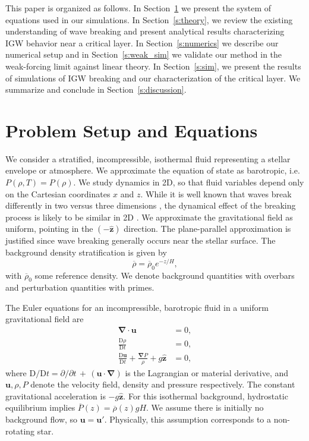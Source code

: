 \documentclass[
        fleqn,
        usenatbib,
    ]{mnras}
\newcommand*{\mdil}[2]{\mathrm{D}#1/\mathrm{D}#2}
\newcommand*{\pdil}[2]{\partial#1/\partial#2}
\newcommand*{\md}[2]{\frac{\mathrm{D}#1}{\mathrm{D}#2}}
\newcommand*{\p}[1]{\left(#1\right)}
\newcommand*{\bm}[1]{\mathbf{#1}}
\newcommand*{\uv}[1]{\hat{\mathbf{#1}}}
\begin{document}
This paper is organized as follows. In Section~\ref{s:equations} we present the
system of equations used in our simulations. In Section~\ref{s:theory}, we
review the existing understanding of wave breaking and present analytical
results characterizing IGW behavior near a critical layer. In
Section~\ref{s:numerics} we describe our numerical setup and in
Section~\ref{s:weak_sim} we validate our method in the weak-forcing limit
against linear theory. In Section~\ref{s:sim}, we present the results of
simulations of IGW breaking and our characterization of the critical layer. We
summarize and conclude in Section~\ref{s:discussion}.

\section{Problem Setup and Equations}\label{s:equations}

We consider a stratified, incompressible, isothermal fluid representing a
stellar envelope or atmosphere. We approximate the equation of state as
\textcolor{Corr}{barotropic}, i.e.\ $P(\rho, T) = P(\rho)$. We study dynamics in
2D, so that fluid variables depend only on the Cartesian coordinates $x$ and
$z$. \textcolor{Corr}{While it is well known that waves break differently in two
versus three dimensions} \citep{klostermeyer,winters1994}, the dynamical effect
of the breaking process is likely to be similar in 2D \citep{barker_ogilvie}. We
approximate the gravitational field as uniform, pointing in the $(-\uv{z})$
direction. The plane-parallel approximation is justified since wave breaking
generally occurs near the stellar surface. The background density stratification
is given by
\begin{equation}
    \overline{\rho} = \overline{\rho}_0 e^{-z/H},
\end{equation}
with $\overline{\rho}_0$ some reference density. We denote background quantities
with overbars and perturbation quantities with primes.

The Euler equations for an incompressible, barotropic fluid in a uniform
gravitational field are
\begin{subequations}\label{se:nl_orig}
    \begin{align}
        \bm{\nabla} \cdot \bm{u} &= 0,\label{eq:nl_incomp}\\
        \md{\rho}{t} &= 0 ,\label{eq:nl_density}\\
        \md{\bm{u}}{t} + \frac{\bm{\nabla}P}{\rho} + g\uv{z} &=
            0\label{eq:nl_mom},
    \end{align}
\end{subequations}
where $\mdil{}{t} = \pdil{}{t}\,+\,\p{\bm{u} \cdot \bm{\nabla}}$ is the
Lagrangian or material derivative, and $\bm{u}, \rho, P$ denote the velocity
field, density and pressure respectively. The constant gravitational
acceleration is $-g\uv{z}$. For this isothermal background, hydrostatic
equilibrium implies \textcolor{Corr}{$\overline{P}(z) = \overline{\rho}(z) g
H$}. We assume there is initially no background flow, so $\bm{u} = \bm{u}'$.
Physically, this assumption corresponds to a non-rotating star.
\end{document}
